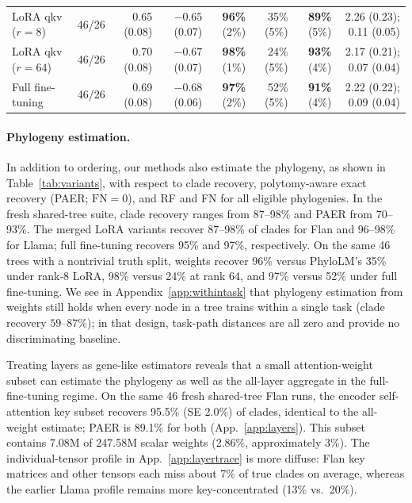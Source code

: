 \documentclass{article}
\theoremstyle{definition}
\theoremstyle{plain}
\begin{document}
\begin{table}[t]
\begin{center}
{\begin{tabular}{lrrrrrrr}
\quad LoRA qkv ($r{=}8$)                 & 46/26 & 0.65 (0.08) & $-0.65$ (0.07) & \textbf{96\%} (2\%) & 35\% (5\%) & \textbf{89\%} (5\%) & 2.26 (0.23); 0.11 (0.05) \\
\quad LoRA qkv ($r{=}64$)                & 46/26 & 0.70 (0.08) & $-0.67$ (0.07) & \textbf{98\%} (1\%) & 24\% (5\%) & \textbf{93\%} (4\%) & 2.17 (0.21); 0.07 (0.04) \\
\quad Full fine-tuning                   & 46/26 & 0.69 (0.08) & $-0.68$ (0.06) & \textbf{97\%} (2\%) & 52\% (5\%) & \textbf{91\%} (4\%) & 2.22 (0.22); 0.09 (0.04) \\
\bottomrule
\end{tabular}
}
\end{center}
\end{table}



\paragraph{Phylogeny estimation.}
\label{sec:results:weighttree}
In addition to ordering, our methods also estimate the phylogeny, as shown in Table~\ref{tab:variants}, with respect to clade recovery, polytomy-aware exact recovery (PAER; $\mathrm{FN}=0$), and RF and FN for all eligible phylogenies. In the fresh shared-tree suite, clade recovery ranges from 87--98\% and PAER from 70--93\%. The merged LoRA variants recover 87--98\% of clades for Flan and 96--98\% for Llama; full fine-tuning recovers 95\% and 97\%, respectively. On the same 46 trees with a nontrivial truth split, weights recover 96\% versus PhyloLM's 35\% under rank-8 LoRA, 98\% versus 24\% at rank 64, and 97\% versus 52\% under full fine-tuning. We see in Appendix~\ref{app:withintask} that phylogeny estimation from weights still holds when every node in a tree trains within a single task (clade recovery $59$--$87\%$); in that design, task-path distances are all zero and provide no discriminating baseline.

Treating layers as gene-like estimators reveals that a small attention-weight subset can estimate the phylogeny as well as the all-layer aggregate in the full-fine-tuning regime. On the same 46 fresh shared-tree Flan runs, the encoder self-attention key subset recovers 95.5\% (SE 2.0\%) of clades, identical to the all-weight estimate; PAER is 89.1\% for both (App.~\ref{app:layers}). This subset contains 7.08M of 247.58M scalar weights (2.86\%, approximately 3\%). The individual-tensor profile in App.~\ref{app:layertrace} is more diffuse: Flan key matrices and other tensors each miss about 7\% of true clades on average, whereas the earlier Llama profile remains more key-concentrated (13\% vs.\ 20\%).
\end{document}
